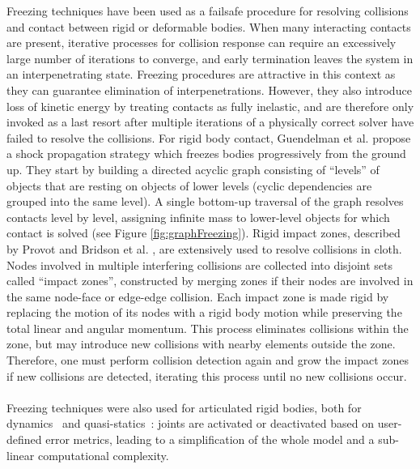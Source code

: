 Freezing techniques have been used as a failsafe procedure for resolving collisions and contact between rigid or deformable bodies.
When many interacting contacts are present, iterative processes for collision response can require an excessively large number of iterations to converge, and early termination leaves the system in an interpenetrating state.
Freezing procedures are attractive in this context as they can guarantee elimination of interpenetrations.
However, they also introduce loss of kinetic energy by treating contacts as fully inelastic, and are therefore only invoked as a last resort after multiple iterations of a physically correct solver have failed to resolve the collisions.
For rigid body contact, Guendelman et al. \cite{Guendelman2003} propose a shock propagation strategy which freezes bodies progressively from the ground up.
They start by building a directed acyclic graph consisting of ``levels'' of objects that are resting on objects of lower levels (cyclic dependencies are grouped into the same level).
A single bottom-up traversal of the graph resolves contacts level by level, assigning infinite mass to lower-level objects for which contact is solved (see Figure \ref{fig:graphFreezing}).
Rigid impact zones, described by Provot \cite{Provot1997} and Bridson et al. \cite{Bridson2002}, are extensively used to resolve collisions in cloth.
Nodes involved in multiple interfering collisions are collected into disjoint sets called ``impact zones'', constructed by merging zones if their nodes are involved in the same node-face or edge-edge collision.
Each impact zone is made rigid by replacing the motion of its nodes with a rigid body motion while preserving the total linear and angular momentum.
This process eliminates collisions within the zone, but may introduce new collisions with nearby elements outside the zone.
Therefore, one must perform collision detection again and grow the impact zones if new collisions are detected, iterating this process until no new collisions occur.
\paragraph*{}
Freezing techniques were also used for articulated rigid bodies, both for dynamics~\cite{Redon2005} and quasi-statics~\cite{Redon2006}: joints are activated or deactivated based on user-defined error metrics, leading to a simplification of the whole model and a sub-linear computational complexity.

